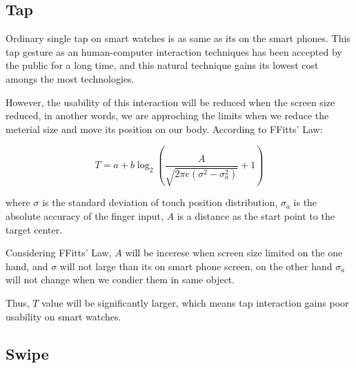 \subsection{Tap}

Ordinary single tap on smart watches is as same as its on the smart phones.
This tap gesture as an human-computer interaction techniques has been accepted by the public for a long time, and this natural technique gains its lowest cost amongs the most technologies.

However, the usability of this interaction will be reduced when the screen size reduced, in another words, we are approching the limits when we reduce the meterial size and move its position on our body. According to FFitts' Law\cite{Bi:2013:FLM:2470654.2466180}:

\begin{equation}
T=a+b\log_{2}{\left(\frac{A}{\sqrt{2\pi e(\sigma^2-\sigma_{a}^2)}}+1 \right)}
\end{equation}

where $\sigma$ is the standard deviation of touch position distribution, $\sigma_a$ is the absolute accuracy of the finger input, $A$ is a distance as the start point to the target center.

Considering FFitts' Law, $A$ will be incerese when screen size limited on the one hand, and $\sigma$ will not large than its on smart phone screen, on the other hand $\sigma_a$ will not change when we condier them in same object.

Thus, $T$ value will be significantly larger, which means tap interaction gains poor usability on smart watches.

\subsection{Swipe}

